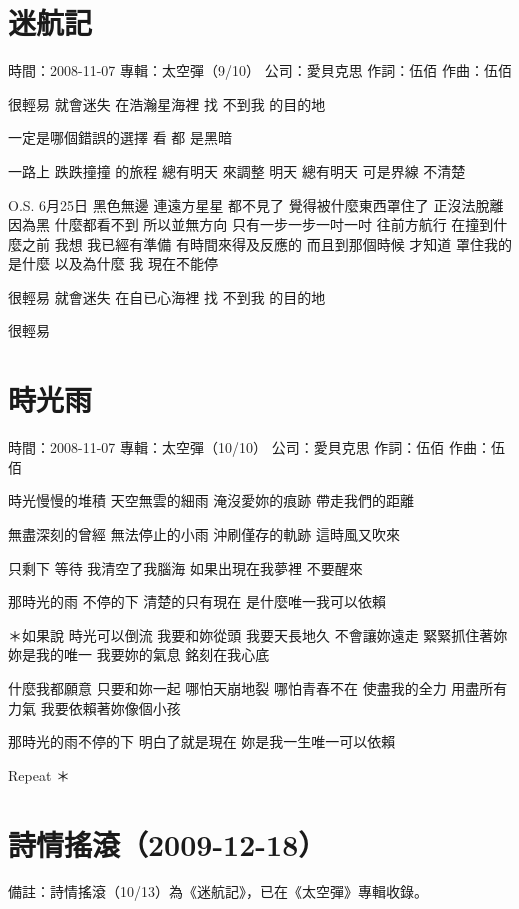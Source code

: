 \documentclass[UTF8,a4paper,oneside,twocolumn,12pt]{ctexbook}
\newcommand{\infopair}[2]{\textbullet #1：#2}
\newcommand{\zc}[1][伍佰]{\infopair{作詞}{#1}}
\newcommand{\zq}[1][伍佰]{\infopair{作曲}{#1}}
\newcommand{\zj}[1]{\infopair{專輯}{#1}}
\newcommand{\sj}[1]{\infopair{時間}{#1}}
\newcommand{\bz}[1]{\infopair{備註}{#1}}
\newcommand{\gs}[1]{\infopair{公司}{#1}}
\newenvironment{info}{\begin{flushleft}\kaishu
	}
	{\end{flushleft}\normalsize\yahei\par}
\newenvironment{lyric}{
	}
{}
\begin{document}
\section{迷航記}
\begin{info}
	\sj{2008-11-07}
	\zj{太空彈（9/10）}
	\gs{愛貝克思}
	\zc
	\zq
\end{info}
\begin{lyric}
	很輕易 就會迷失 在浩瀚星海裡
	找 不到我 的目的地

	一定是哪個錯誤的選擇
	看 都 是黑暗

	一路上 跌跌撞撞 的旅程
	總有明天 來調整
	明天 總有明天
	可是界線 不清楚

	O.S.
	6月25日 黑色無邊 連遠方星星
	都不見了 覺得被什麼東西罩住了
	正沒法脫離 因為黑 什麼都看不到
	所以並無方向 只有一步一步一吋一吋
	往前方航行 在撞到什麼之前
	我想 我已經有準備 有時間來得及反應的
	而且到那個時候 才知道 罩住我的是什麼
	以及為什麼 我 現在不能停

	很輕易 就會迷失 在自已心海裡
	找 不到我 的目的地

	很輕易
\end{lyric}

\section{時光雨}
\begin{info}
	\sj{2008-11-07}
	\zj{太空彈（10/10）}
	\gs{愛貝克思}
	\zc
	\zq
\end{info}
\begin{lyric}
	時光慢慢的堆積
	天空無雲的細雨
	淹沒愛妳的痕跡
	帶走我們的距離

	無盡深刻的曾經
	無法停止的小雨
	沖刷僅存的軌跡
	這時風又吹來

	只剩下 等待
	我清空了我腦海
	如果出現在我夢裡
	不要醒來

	那時光的雨 不停的下
	清楚的只有現在
	是什麼唯一我可以依賴

	＊如果說
	時光可以倒流
	我要和妳從頭
	我要天長地久
	不會讓妳遠走
	緊緊抓住著妳
	妳是我的唯一
	我要妳的氣息
	銘刻在我心底

	什麼我都願意
	只要和妳一起
	哪怕天崩地裂
	哪怕青春不在
	使盡我的全力
	用盡所有力氣
	我要依賴著妳像個小孩

	那時光的雨不停的下
	明白了就是現在
	妳是我一生唯一可以依賴

	Repeat ＊
\end{lyric}

\section*{詩情搖滾（2009-12-18）}
\begin{info}
	\bz{詩情搖滾（10/13）為《迷航記》，已在《太空彈》專輯收錄。}
\end{info}
\end{document}
